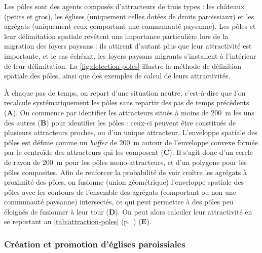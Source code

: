 Les pôles sont des agents composés d'attracteurs de trois types : les châteaux (petits et gros), les églises (uniquement celles dotées de droits paroissiaux) et les agrégats (uniquement ceux comportant une communauté paysanne).
Les pôles et leur délimitation spatiale revêtent une importance particulière lors de la migration des foyers paysans : ils attirent d'autant plus que leur attractivité est importante, et le cas échéant, les foyers paysans migrants s'installent à l'intérieur de leur délimitation.
La \cref{fig:detection-poles} illustre la méthode de définition spatiale des pôles, ainsi que des exemples de calcul de leurs attractivités.

À chaque pas de temps, on repart d'une situation \og neutre\fg{}, c'est-à-dire que l'on recalcule systématiquement les pôles sans repartir des pas de temps précédents (\textbf{A}).
On commence par identifier les attracteurs situés à moins de 200~m les uns des autres (\textbf{B}) pour identifier les pôles : ceux-ci peuvent être constitués de plusieurs attracteurs proches, ou d'un unique attracteur.
L'enveloppe spatiale des pôles est définie comme un \textit{buffer} de 200~m autour de l'enveloppe convexe formée par le centroïde des attracteurs qui les composent (\textbf{C}). Il s'agit donc d'un cercle de rayon de 200~m pour les pôles mono-attracteurs, et d'un polygone pour les pôles composites.
Afin de renforcer la probabilité de voir croître les agrégats à proximité des pôles, on fusionne (union géométrique) l'enveloppe spatiale des pôles avec les contours de l'ensemble des agrégats (comportant ou non une communauté paysanne) intersectés, ce qui peut permettre à des pôles peu éloignés de fusionner à leur tour (\textbf{D}).
On peut alors calculer leur attractivité en se reportant au \cref{tab:attraction-poles} (p.~\pageref{tab:attraction-poles}) (\textbf{E}).


	
	\subsubsection{Création et promotion d'églises paroissiales \label{sssec:paroisses}}
	
